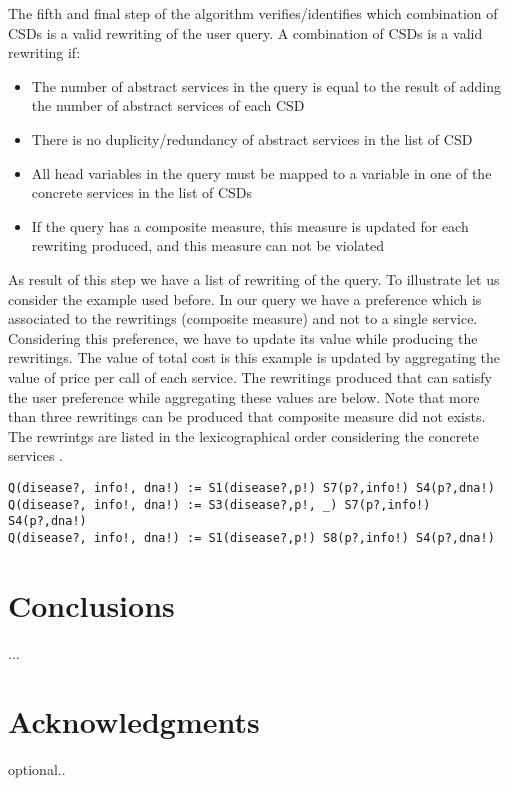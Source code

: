 \documentclass{sig-alternate}
\begin{document}
The fifth and final step of the algorithm verifies/identifies which combination of CSDs is a valid rewriting of the user query. A combination of CSDs is a valid rewriting if:
\begin{itemize}
\item The number of abstract services in the query is equal to the result of adding the number of abstract services of each CSD
\item There is no duplicity/redundancy of abstract services in the list of CSD
\item All head variables in the query must be mapped to a variable in one of the concrete services in the list of CSDs
\item If the query has a composite measure, this measure is updated for each rewriting produced, and this measure can not be violated
\end{itemize}

As result of this step we have a list of rewriting of the query. To illustrate let us consider the example used before.
In our query we have a preference which is associated to the rewritings (composite measure) and not to a single service. Considering this preference, we have to update its value while producing the rewritings.
The value of total cost is this example is updated by aggregating the value of price per call of each service. The rewritings produced that can satisfy the user preference while aggregating these values are below. Note that more than three rewritings can be produced that composite measure did not exists. The rewrintgs are listed in the lexicographical order considering the concrete services
.
\begin{verbatim}
Q(disease?, info!, dna!) := S1(disease?,p!) S7(p?,info!) S4(p?,dna!)
Q(disease?, info!, dna!) := S3(disease?,p!, _) S7(p?,info!) S4(p?,dna!)
Q(disease?, info!, dna!) := S1(disease?,p!) S8(p?,info!) S4(p?,dna!)
\end{verbatim}

\section{Conclusions}
...

\section{Acknowledgments}
optional..

%

\end{document}
